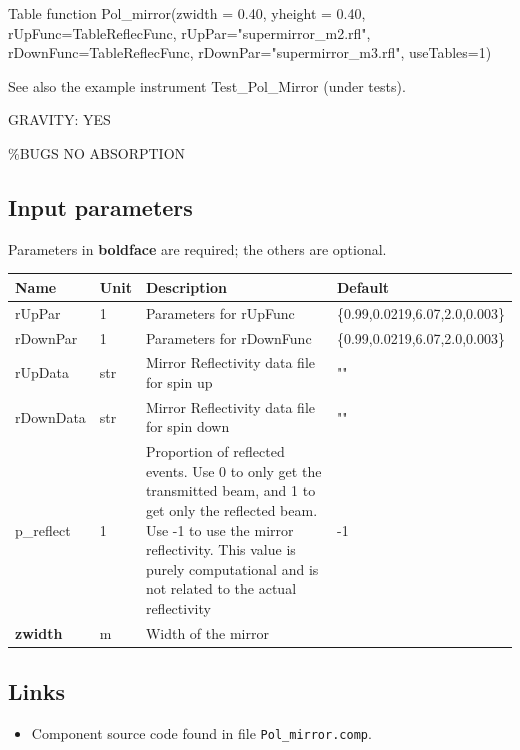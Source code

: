 Table function Pol\_mirror(zwidth = 0.40, yheight = 0.40, rUpFunc=TableReflecFunc, rUpPar="supermirror\_m2.rfl", rDownFunc=TableReflecFunc, rDownPar="supermirror\_m3.rfl", useTables=1)

See also the example instrument Test\_Pol\_Mirror (under tests).

GRAVITY: YES

\%BUGS NO ABSORPTION

\subsection*{Input parameters}
Parameters in \textbf{boldface} are required; the others are optional.

\begin{longtable}{p{}p{}p{}p{}}
\toprule
\textbf{Name} & \textbf{Unit} & \textbf{Description} & \textbf{Default} \\
\midrule
\endhead
rUpPar & 1 & Parameters for rUpFunc & \{0.99,0.0219,6.07,2.0,0.003\} \\
rDownPar & 1 & Parameters for rDownFunc & \{0.99,0.0219,6.07,2.0,0.003\} \\
rUpData & str & Mirror Reflectivity data file for spin up & "" \\
rDownData & str & Mirror Reflectivity data file for spin down & "" \\
p\_reflect & 1 & Proportion of reflected events. Use 0 to only get the transmitted beam, and 1 to get only the reflected beam. Use -1 to use the mirror reflectivity. This value is purely computational and is not related to the actual reflectivity & -1 \\
\textbf{zwidth} & m & Width of the mirror &  \\
\bottomrule
\end{longtable}

\subsection*{Links}
\begin{itemize}
  \item Component source code found in file \texttt{Pol\_mirror.comp}.
\end{itemize}
